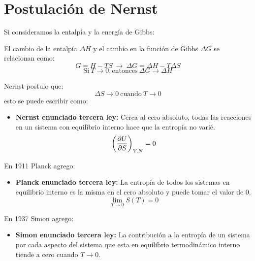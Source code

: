 \documentclass[../main]{subfiles}
\begin{document}
\section{Postulación de Nernst}
Si consideramos la entalpía y la energía de Gibbs:
\begin{center}
    El cambio de la entalpía $\Delta H$ y el cambio en la función de Gibbs $\Delta G$ se relacionan como:
    \begin{equation}
        G=H-TS \ \rightarrow \ \Delta G=\Delta H-T \Delta S
    \end{equation}
    \begin{equation}
        \text{Si} \ T \rightarrow 0, \text{entonces} \ \Delta G \rightarrow \Delta H
    \end{equation}
\end{center}
Nernst postulo que:
\begin{equation}
    \Delta S \rightarrow 0 \ \text{cuando} \ T \rightarrow 0
\end{equation}
esto se puede escribir como:
\begin{itemize}
    \item \textbf{Nernst enunciado tercera ley:} Cerca al cero absoluto, todas las reacciones en un sistema con equilibrio interno hace que la entropía no varié.
    \begin{equation}
        \left( \pdv{U}{S}\right)_{V,N}=0
    \end{equation}
\end{itemize}
En 1911 Planck agrego:
\begin{itemize}
    \item \textbf{Planck enunciado tercera ley:} La entropía de todos los sistemas en equilibrio interno es la misma en el cero absoluto y puede tomar el valor de 0.
    \begin{equation}
        \lim_{T \rightarrow 0} S(T)=0
    \end{equation}
\end{itemize}
En 1937 Simon agrego:
\begin{itemize}
    \item \textbf{Simon enunciado tercera ley:} La contribución a la entropía de un sistema por cada aspecto del sistema que esta en equilibrio termodinámico interno tiende a cero cuando $T\rightarrow 0$.
\end{itemize}
\end{document}

